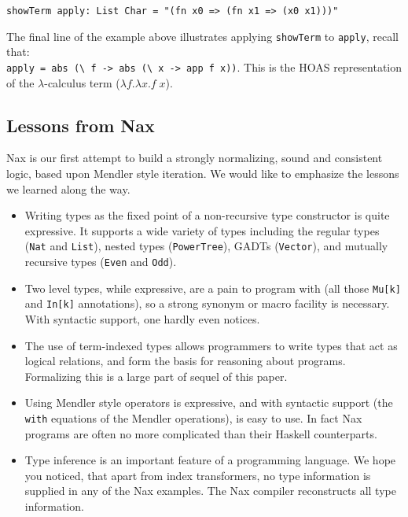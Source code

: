 {{\begin{verbatim}
showTerm apply: List Char = "(fn x0 => (fn x1 => (x0 x1)))"
\end{verbatim}}

The final line of the example above illustrates applying \verb+showTerm+
to \verb+apply+, recall that:\\
\verb+apply = abs (\ f -> abs (\ x -> app f x))+. This is the HOAS
representation of the $\lambda$-calculus term
($\lambda f . \lambda x . f\; x$).

\subsection{Lessons from Nax}

Nax is our first attempt to build a strongly normalizing, sound and consistent
logic, based upon Mendler style iteration. We would like to
emphasize the lessons we learned along the way.

\begin{itemize}
\item Writing types as the fixed point of a non-recursive type constructor
is quite expressive. It supports a wide variety of types including
the regular types (\verb+Nat+ and \verb+List+), nested types (\verb+PowerTree+),
{\small GADT}s (\verb+Vector+), and mutually recursive types (\verb+Even+ and \verb+Odd+).

\item Two level types, while expressive, are a pain to program with (all those
\verb+Mu[k]+ and \verb+In[k]+ annotations), so a strong synonym or macro
facility is necessary. With syntactic support, one hardly even notices.

\item The use of term-indexed types allows programmers to write types that
act as logical relations, and form the basis for reasoning about programs.
Formalizing this is a large part of sequel of this paper.

\item Using Mendler style operators is expressive, and with syntactic support
(the \verb+with+ equations of the Mendler operations), is easy to use. In
fact Nax programs are often no more complicated than their Haskell counterparts.

\item Type inference is an important feature of a programming language. We
hope you noticed, that apart from index transformers, no type information
is supplied in any of the Nax examples. The Nax compiler reconstructs
all type information.


\end{itemize}}
